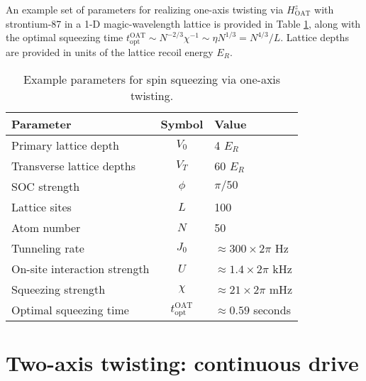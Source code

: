 \documentclass[aps,notitlepage,nofootinbib,11pt]{revtex4-1}
\renewcommand{\t}{\text} %
\newcommand{\1}{\mathds{1}}
\begin{document}
An example set of parameters for realizing one-axis twisting via
$H_{\t{OAT}}^z$ with strontium-87 in a 1-D magic-wavelength lattice is
provided in Table \ref{tab:parameters}, along with the optimal
squeezing time
$t_{\t{opt}}^{\t{OAT}}\sim N^{-2/3}\chi^{-1}\sim\eta
N^{1/3}=N^{4/3}/L$.  Lattice depths are provided in units of the
lattice recoil energy $E_R$.

\begin{table}[h]
  \centering
  \caption{Example parameters for spin squeezing via one-axis
    twisting.}
  \label{tab:parameters}
  \begin{tabular}{|l|c|l|}
    \hline
    Parameter & Symbol & Value \\ \hline\hline
    Primary lattice depth & $V_0$ & 4 $E_R$ \\
    Transverse lattice depths & $V_T$ & 60 $E_R$ \\
    SOC strength & $\phi$ & $\pi/50$ \\
    Lattice sites & $L$ & 100 \\
    Atom number & $N$ & 50 \\ \hline\hline
    Tunneling rate & $J_0$ & $\approx300\times2\pi$ Hz \\
    On-site interaction strength & $U$ & $\approx1.4\times2\pi$ kHz \\
    Squeezing strength & $\chi$ & $\approx21\times2\pi$ mHz \\
    Optimal squeezing time & $t_{\t{opt}}^{\t{OAT}}$
    & $\approx0.59$ seconds \\ \hline
  \end{tabular}
\end{table}


\section{Two-axis twisting: continuous drive}
\label{sec:continuous_drive}
\end{document}

